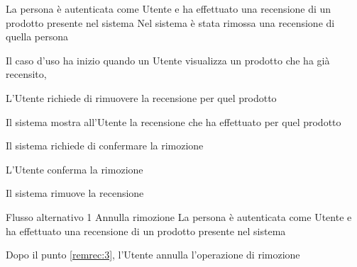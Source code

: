 {}
{La persona è autenticata come Utente e ha effettuato una recensione di un prodotto presente nel sistema}
{Nel sistema è stata rimossa una recensione di quella persona}
{\begin{enumCU}
	\item Il caso d'uso ha inizio quando un Utente visualizza un prodotto che ha già recensito, 
	\item L'Utente richiede di rimuovere la recensione per quel prodotto
	\item Il sistema mostra all'Utente la recensione che ha effettuato per quel prodotto
	\item Il sistema richiede di confermare la rimozione \label{remrec:3}
	\item L'Utente conferma la rimozione
	\item Il sistema rimuove la recensione
\end{enumCU}}
%
{Flusso alternativo 1}%
{Annulla rimozione}%
{La persona è autenticata come Utente e ha effettuato una recensione di un prodotto presente nel sistema}
{\postNulle}%
{\begin{enumCU}
		\item Dopo il punto \ref{remrec:3}, l'Utente annulla l'operazione di rimozione
	\end{enumCU}}%

\tabcuvspace

